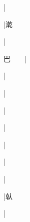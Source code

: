 \begin{multicols}{2}
{{}|{}\par
{}|{\cjk{}漧}\par
{}|{}\par
{\cjk{}巴{\cnsym{}　}{\cnsym{}　}}|{}\par
{\cjk{}{\cnsym{}　}{\cnsym{}　}{\cnsym{}　}}|{}\par
{}|{}\par
{\cjk{}{\cnsym{}　}{\cnsym{}　}{\cnsym{}　}}|{}\par
{\cjk{}{\cnsym{}　}{\cnsym{}　}{\cnsym{}　}}|{}\par
{\cjk{}{\cnsym{}　}{\cnsym{}　}{\cnsym{}　}}|{}\par
{\cjk{}{\cnsym{}　}{\cnsym{}　}{\cnsym{}　}}|{}\par
{\cjk{}{\cnsym{}　}{\cnsym{}　}{\cnsym{}　}}|{}\par
{\cjk{}{\cnsym{}　}{\cnsym{}　}{\cnsym{}　}}|{\cjk{}倝}\par
{\cjk{}{\cnsym{}　}{\cnsym{}　}{\cnsym{}　}}|{}\par
}
\end{multicols}
